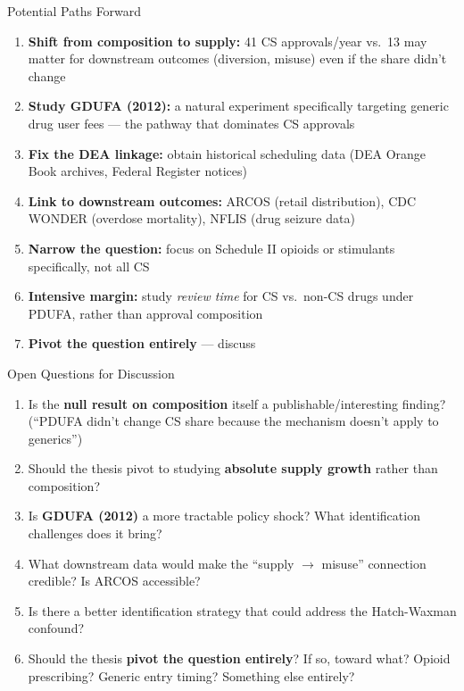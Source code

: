 \documentclass[10pt]{beamer}
\begin{document}
\begin{frame}[t]{Potential Paths Forward}
  \begin{enumerate}
    \item \textbf{Shift from composition to supply:} 41 CS approvals/year vs.\
          13 may matter for downstream outcomes (diversion, misuse) even if
          the share didn't change
    \item \textbf{Study GDUFA (2012):} a natural experiment specifically
          targeting generic drug user fees --- the pathway that dominates CS
          approvals
    \item \textbf{Fix the DEA linkage:} obtain historical scheduling data
          (DEA Orange Book archives, Federal Register notices)
    \item \textbf{Link to downstream outcomes:} ARCOS (retail distribution),
          CDC WONDER (overdose mortality), NFLIS (drug seizure data)
    \item \textbf{Narrow the question:} focus on Schedule II opioids or
          stimulants specifically, not all CS
    \item \textbf{Intensive margin:} study \textit{review time} for CS vs.\
          non-CS drugs under PDUFA, rather than approval composition
    \item \textbf{Pivot the question entirely} --- discuss
  \end{enumerate}
\end{frame}

\begin{frame}[t]{Open Questions for Discussion}
  \begin{enumerate}
    \item Is the \textbf{null result on composition} itself a
          publishable/interesting finding? (``PDUFA didn't change CS share
          because the mechanism doesn't apply to generics'')
    \item Should the thesis pivot to studying \textbf{absolute supply growth}
          rather than composition?
    \item Is \textbf{GDUFA (2012)} a more tractable policy shock? What
          identification challenges does it bring?
    \item What downstream data would make the ``supply $\to$ misuse''
          connection credible? Is ARCOS accessible?
    \item Is there a better identification strategy that could address the
          Hatch-Waxman confound?
    \item Should the thesis \textbf{pivot the question entirely}? If so,
          toward what? Opioid prescribing? Generic entry timing? Something
          else entirely?
  \end{enumerate}
\end{frame}
\end{document}
